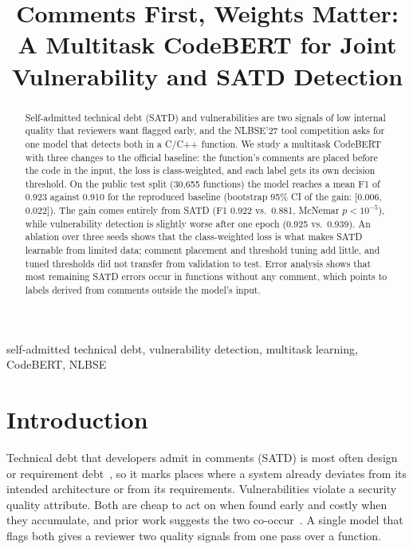 \documentclass[conference]{IEEEtran}
\begin{document}
\title{Comments First, Weights Matter: A Multitask CodeBERT for Joint Vulnerability and SATD Detection}

\author{
}

\maketitle

\begin{abstract}
Self-admitted technical debt (SATD) and vulnerabilities are two signals of low internal quality that reviewers want flagged early, and the NLBSE'27 tool competition asks for one model that detects both in a C/C++ function. We study a multitask CodeBERT with three changes to the official baseline: the function's comments are placed before the code in the input, the loss is class-weighted, and each label gets its own decision threshold. On the public test split (30,655 functions) the model reaches a mean F1 of 0.923 against 0.910 for the reproduced baseline (bootstrap 95\% CI of the gain: [0.006, 0.022]). The gain comes entirely from SATD (F1 0.922 vs.\ 0.881, McNemar $p<10^{-5}$), while vulnerability detection is slightly worse after one epoch (0.925 vs.\ 0.939). An ablation over three seeds shows that the class-weighted loss is what makes SATD learnable from limited data; comment placement and threshold tuning add little, and tuned thresholds did not transfer from validation to test. Error analysis shows that most remaining SATD errors occur in functions without any comment, which points to labels derived from comments outside the model's input.
\end{abstract}

\begin{IEEEkeywords}
self-admitted technical debt, vulnerability detection, multitask learning, CodeBERT, NLBSE
\end{IEEEkeywords}

\section{Introduction}
Technical debt that developers admit in comments (SATD) is most often design or requirement debt~\cite{maldonado2017}, so it marks places where a system already deviates from its intended architecture or from its requirements. Vulnerabilities violate a security quality attribute. Both are cheap to act on when found early and costly when they accumulate, and prior work suggests the two co-occur~\cite{russo2025}. A single model that flags both gives a reviewer two quality signals from one pass over a function.
\end{document}
